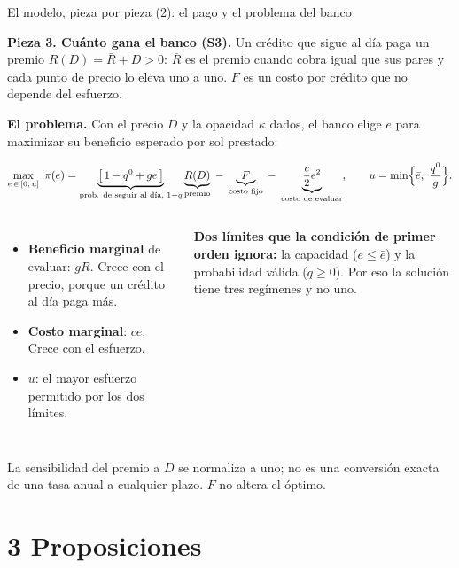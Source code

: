 \documentclass[aspectratio=169,10pt,t]{beamer}
\newcommand{\source}[1]{\par\vfill{\fontsize{6}{7.2}\selectfont\color{soft}#1\par}}
\newcommand{\qz}{q^{0}}
\newcommand{\eb}{\bar e}
\begin{document}
\begin{frame}{El modelo, pieza por pieza (2): el pago y el problema del banco}
\vspace{1.3mm}
{\small\textbf{Pieza 3. Cuánto gana el banco (S3).} Un crédito que sigue al día paga un
premio $R(D)=\bar R+D>0$: $\bar R$ es el premio cuando cobra igual que sus pares y
cada punto de precio lo eleva uno a uno. $F$ es un costo por crédito que no depende
del esfuerzo.

\vspace{.8mm}
\textbf{El problema.} Con el precio $D$ y la opacidad $\kappa$ dados, el banco elige
$e$ para maximizar su beneficio esperado por sol prestado:\par}
\vspace{-1.5mm}
\[
\max_{e\,\in\,[0,\,u]}\ \pi(e)=
\underbrace{\bigl[\,1-\qz+ge\,\bigr]}_{\text{prob. de seguir al día, }1-q}
\underbrace{R(D)}_{\text{premio}}
\;-\;\underbrace{F}_{\text{costo fijo}}
\;-\;\underbrace{\frac{c}{2}e^{2}}_{\text{costo de evaluar}},
\qquad u=\min\Bigl\{\eb,\ \frac{\qz}{g}\Bigr\}.
\]
\vspace{-2.5mm}
\begin{columns}[T,onlytextwidth]
\begin{itemize}\setlength{\itemsep}{.6mm}\small
\item \textbf{Beneficio marginal} de evaluar: $gR$. Crece con el precio, porque un
crédito al día paga más.
\item \textbf{Costo marginal}: $ce$. Crece con el esfuerzo.
\item $u$: el mayor esfuerzo permitido por los dos límites.
\end{itemize}
\begin{keybox}\small
\textbf{Dos límites que la condición de primer orden ignora:} la capacidad
($e\le\eb$) y la probabilidad válida ($q\ge 0$). Por eso la solución tiene tres
regímenes y no uno.
\end{keybox}
\end{columns}
\source{La sensibilidad del premio a $D$ se normaliza a uno; no es una conversión exacta
de una tasa anual a cualquier plazo. $F$ no altera el óptimo.}
\end{frame}

\section{3 Proposiciones}
\end{document}

